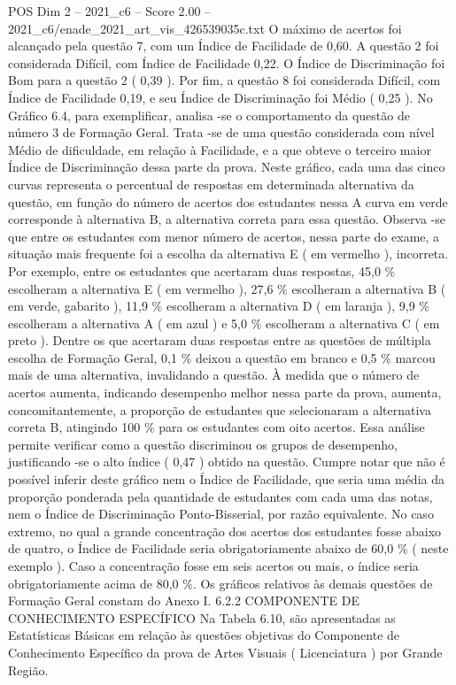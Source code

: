 \begin{textsample}{POS Dim 2 – 2021\_c6 – Score 2.00 – 2021\_c6/enade\_2021\_art\_vis\_426539035c.txt}
O máximo de acertos foi alcançado pela questão 7, com um Índice de Facilidade de 0,60.
A questão 2 foi considerada Difícil, com Índice de Facilidade 0,22.
O Índice de Discriminação foi Bom para a questão 2 ( 0,39 ).
Por fim, a questão 8 foi considerada Difícil, com Índice de Facilidade 0,19, e seu Índice de Discriminação foi Médio ( 0,25 ).
No Gráfico 6.4, para exemplificar, analisa -se o comportamento da questão de número 3 de Formação Geral.
Trata -se de uma questão considerada com nível Médio de dificuldade, em relação à Facilidade, e a que obteve o terceiro maior Índice de Discriminação dessa parte da prova.
Neste gráfico, cada uma das cinco curvas representa o percentual de respostas em determinada alternativa da questão, em função do número de acertos dos estudantes nessa A curva em verde corresponde à alternativa B, a alternativa correta para essa questão.
Observa -se que entre os estudantes com menor número de acertos, nessa parte do exame, a situação mais frequente foi a escolha da alternativa E ( em vermelho ), incorreta.
Por exemplo, entre os estudantes que acertaram duas respostas, 45,0 \% escolheram a alternativa E ( em vermelho ), 27,6 \% escolheram a alternativa B ( em verde, gabarito ), 11,9 \% escolheram a alternativa D ( em laranja ), 9,9 \% escolheram a alternativa A ( em azul ) e 5,0 \% escolheram a alternativa C ( em preto ).
Dentre os que acertaram duas respostas entre as questões de múltipla escolha de Formação Geral, 0,1 \% deixou a questão em branco e 0,5 \% marcou mais de uma alternativa, invalidando a questão.
À medida que o número de acertos aumenta, indicando desempenho melhor nessa parte da prova, aumenta, concomitantemente, a proporção de estudantes que selecionaram a alternativa correta B, atingindo 100 \% para os estudantes com oito acertos.
Essa análise permite verificar como a questão discriminou os grupos de desempenho, justificando -se o alto índice ( 0,47 ) obtido na questão.
Cumpre notar que não é possível inferir deste gráfico nem o Índice de Facilidade, que seria uma média da proporção ponderada pela quantidade de estudantes com cada uma das notas, nem o Índice de Discriminação Ponto-Bisserial, por razão equivalente.
No caso extremo, no qual a grande concentração dos acertos dos estudantes fosse abaixo de quatro, o Índice de Facilidade seria obrigatoriamente abaixo de 60,0 \% ( neste exemplo ).
Caso a concentração fosse em seis acertos ou mais, o índice seria obrigatoriamente acima de 80,0 \%.
Os gráficos relativos às demais questões de Formação Geral constam do Anexo I. 6.2.2 COMPONENTE DE CONHECIMENTO ESPECÍFICO Na Tabela 6.10, são apresentadas as Estatísticas Básicas em relação às questões objetivas do Componente de Conhecimento Específico da prova de Artes Visuais ( Licenciatura ) por Grande Região.

\end{textsample}
